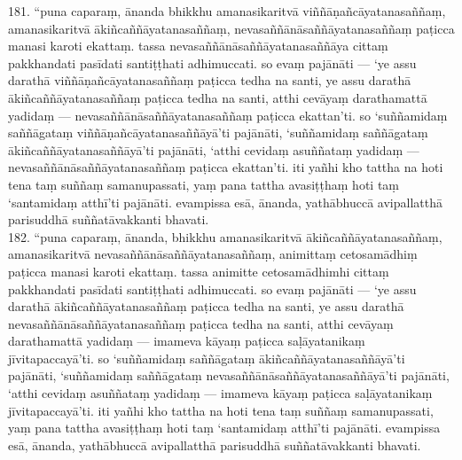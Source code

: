 \documentclass[11pt]{article}
\begin{document}
181. “puna caparaṃ, ānanda bhikkhu amanasikaritvā viññāṇañcāyatanasaññaṃ, amanasikaritvā ākiñcaññāyatanasaññaṃ, nevasaññānāsaññāyatanasaññaṃ paṭicca manasi karoti ekattaṃ. tassa nevasaññānāsaññāyatanasaññāya cittaṃ pakkhandati pasīdati santiṭṭhati adhimuccati. so evaṃ pajānāti — ‘ye assu darathā viññāṇañcāyatanasaññaṃ paṭicca tedha na santi, ye assu darathā ākiñcaññāyatanasaññaṃ paṭicca tedha na santi, atthi cevāyaṃ darathamattā yadidaṃ — nevasaññānāsaññāyatanasaññaṃ paṭicca ekattan’ti. so ‘suññamidaṃ saññāgataṃ viññāṇañcāyatanasaññāyā’ti pajānāti, ‘suññamidaṃ saññāgataṃ ākiñcaññāyatanasaññāyā’ti pajānāti, ‘atthi cevidaṃ asuññataṃ yadidaṃ — nevasaññānāsaññāyatanasaññaṃ paṭicca ekattan’ti. iti yañhi kho tattha na hoti tena taṃ suññaṃ samanupassati, yaṃ pana tattha avasiṭṭhaṃ hoti taṃ ‘santamidaṃ atthī’ti pajānāti. evampissa esā, ānanda, yathābhuccā avipallatthā parisuddhā suññatāvakkanti bhavati.\\

182. “puna caparaṃ, ānanda, bhikkhu amanasikaritvā ākiñcaññāyatanasaññaṃ, amanasikaritvā nevasaññānāsaññāyatanasaññaṃ, animittaṃ cetosamādhiṃ paṭicca manasi karoti ekattaṃ. tassa animitte cetosamādhimhi cittaṃ pakkhandati pasīdati santiṭṭhati adhimuccati. so evaṃ pajānāti — ‘ye assu darathā ākiñcaññāyatanasaññaṃ paṭicca tedha na santi, ye assu darathā nevasaññānāsaññāyatanasaññaṃ paṭicca tedha na santi, atthi cevāyaṃ darathamattā yadidaṃ — imameva kāyaṃ paṭicca saḷāyatanikaṃ jīvitapaccayā’ti. so ‘suññamidaṃ saññāgataṃ ākiñcaññāyatanasaññāyā’ti pajānāti, ‘suññamidaṃ saññāgataṃ nevasaññānāsaññāyatanasaññāyā’ti pajānāti, ‘atthi cevidaṃ asuññataṃ yadidaṃ — imameva kāyaṃ paṭicca saḷāyatanikaṃ jīvitapaccayā’ti. iti yañhi kho tattha na hoti tena taṃ suññaṃ samanupassati, yaṃ pana tattha avasiṭṭhaṃ hoti taṃ ‘santamidaṃ atthī’ti pajānāti. evampissa esā, ānanda, yathābhuccā avipallatthā parisuddhā suññatāvakkanti bhavati.\\
\end{document}
